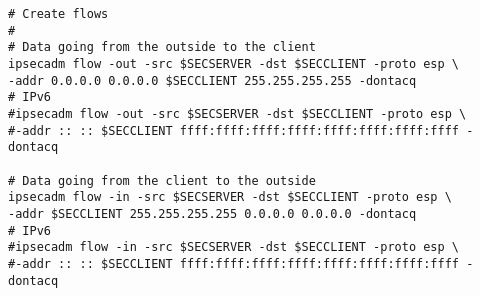
\small
\begin{verbatim}
# Create flows
#
# Data going from the outside to the client
ipsecadm flow -out -src $SECSERVER -dst $SECCLIENT -proto esp \
-addr 0.0.0.0 0.0.0.0 $SECCLIENT 255.255.255.255 -dontacq
# IPv6
#ipsecadm flow -out -src $SECSERVER -dst $SECCLIENT -proto esp \
#-addr :: :: $SECCLIENT ffff:ffff:ffff:ffff:ffff:ffff:ffff:ffff -dontacq

# Data going from the client to the outside
ipsecadm flow -in -src $SECSERVER -dst $SECCLIENT -proto esp \
-addr $SECCLIENT 255.255.255.255 0.0.0.0 0.0.0.0 -dontacq
# IPv6
#ipsecadm flow -in -src $SECSERVER -dst $SECCLIENT -proto esp \
#-addr :: :: $SECCLIENT ffff:ffff:ffff:ffff:ffff:ffff:ffff:ffff -dontacq
\end{verbatim}



